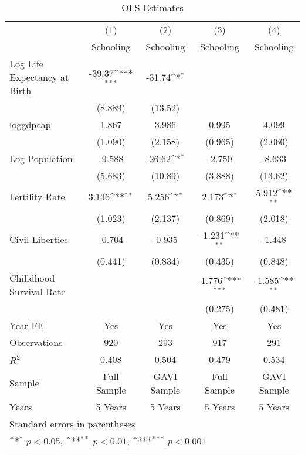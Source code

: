 \begin{table}[htbp]\centering
\def\sym#1{\ifmmode^{#1}\else\(^{#1}\)\fi}
\caption{OLS Estimates}
\begin{tabular}{l*{4}{c}}
\toprule
                &\multicolumn{1}{c}{(1)}&\multicolumn{1}{c}{(2)}&\multicolumn{1}{c}{(3)}&\multicolumn{1}{c}{(4)}\\
                &\multicolumn{1}{c}{Schooling}&\multicolumn{1}{c}{Schooling}&\multicolumn{1}{c}{Schooling}&\multicolumn{1}{c}{Schooling}\\
\midrule
Log Life Expectancy at Birth&   -39.37\sym{***}&   -31.74\sym{*}  &                  &                  \\
                &  (8.889)         &  (13.52)         &                  &                  \\
\addlinespace
loggdpcap       &    1.867         &    3.986         &    0.995         &    4.099         \\
                &  (1.090)         &  (2.158)         &  (0.965)         &  (2.060)         \\
\addlinespace
Log Population  &   -9.588         &   -26.62\sym{*}  &   -2.750         &   -8.633         \\
                &  (5.683)         &  (10.89)         &  (3.888)         &  (13.62)         \\
\addlinespace
Fertility Rate  &    3.136\sym{**} &    5.256\sym{*}  &    2.173\sym{*}  &    5.912\sym{**} \\
                &  (1.023)         &  (2.137)         &  (0.869)         &  (2.018)         \\
\addlinespace
Civil Liberties &   -0.704         &   -0.935         &   -1.231\sym{**} &   -1.448         \\
                &  (0.441)         &  (0.834)         &  (0.435)         &  (0.848)         \\
\addlinespace
Chilldhood Survival Rate&                  &                  &   -1.776\sym{***}&   -1.585\sym{**} \\
                &                  &                  &  (0.275)         &  (0.481)         \\
\addlinespace
Year FE         &      Yes         &      Yes         &      Yes         &      Yes         \\
\midrule
Observations    &      920         &      293         &      917         &      291         \\
\(R^{2}\)       &    0.408         &    0.504         &    0.479         &    0.534         \\
Sample          &Full Sample         &GAVI Sample         &Full Sample         &GAVI Sample         \\
Years           &  5 Years         &  5 Years         &  5 Years         &  5 Years         \\
\bottomrule
\multicolumn{5}{l}{\footnotesize Standard errors in parentheses}\\
\multicolumn{5}{l}{\footnotesize \sym{*} \(p<0.05\), \sym{**} \(p<0.01\), \sym{***} \(p<0.001\)}\\
\end{tabular}
\end{table}
